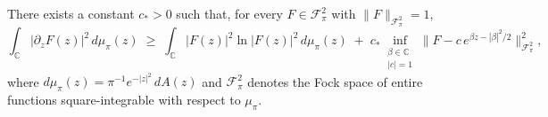 
\begin{theorem}[Frank--Nicola--Tilli, {\cite[Thm.~14]{FrankNicolaTilli2025}}, $h=\pi$]
There exists a constant $c_\ast > 0$ such that, for every
$F \in \mathcal{F}^2_\pi$ with $\|F\|_{\mathcal{F}^2_\pi} = 1$,
\begin{equation}
  \int_{\mathbb{C}} |\partial_z F(z)|^2 \, d\mu_\pi(z)
  \;\ge\;
  \int_{\mathbb{C}} |F(z)|^2 \ln |F(z)|^2 \, d\mu_\pi(z)
  \;+\;
  c_\ast \!\!\inf_{\substack{\beta \in \mathbb{C} \\ |c|=1}}\!
  \bigl\| F - c\, e^{\beta z - |\beta|^2/2} \bigr\|_{\mathcal{F}^2_\pi}^{2},
\end{equation}
where $d\mu_\pi(z) = \pi^{-1} e^{-|z|^2}\, dA(z)$ and $\mathcal{F}^2_\pi$
denotes the Fock space of entire functions square-integrable with respect
to $\mu_\pi$.
\end{theorem}
